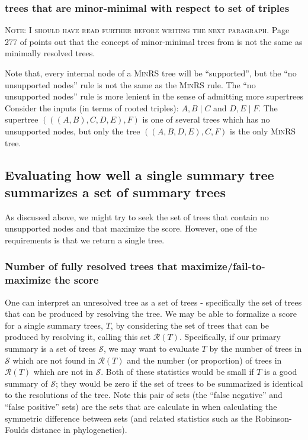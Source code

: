 \documentclass[11pt]{article}
\begin{document}
\subsubsection{trees that are minor-minimal with respect to set of triples}
\textsc{Note: I should have read \citet{JanssonLL2012} further before writing the next paragraph.}
Page 277 of \citet{JanssonLL2012} points out that the concept of minor-minimal trees from \citet{Semple2003} is not the same as minimally resolved trees.

Note that, every internal node of a \textsc{MinRS} tree will be ``supported'', but the
    ``no unsupported nodes'' rule is not the same as the \textsc{MinRS} rule.
The ``no unsupported nodes'' rule is more lenient in the sense of admitting more supertrees
Consider the inputs (in terms of rooted triples): $A,B\mid C$ and $D,E\mid F$.
The supertree $(((A,B),C,D,E),F)$ is one of several trees which has no unsupported nodes, but 
    only the tree $((A,B,D,E),C,F)$ is the only \textsc{MinRS} tree.


\subsection{Evaluating how well a single summary tree summarizes a set of summary trees}\label{treeAdmissibility}
As discussed above, we might try to seek the set of trees that contain no unsupported nodes and that
    maximize the \SWIPSD score.
However, one of the requirements is that we return a single tree.

\subsubsection{Number of fully resolved trees that maximize/fail-to-maximize the \SWIPSD score}
One can interpret an unresolved tree as a set of trees - specifically the set of trees that 
    can be produced by resolving the tree.
We may be able to formalize a score for a single summary trees, $T$, by considering
    the set of trees that can be produced by resolving it, calling this set $\mathcal{R}(T)$.
Specifically, if our primary summary is a set of trees $\mathcal{S}$, we may want
    to evaluate $T$ by the number of trees in $\mathcal{S}$ which are not found
    in $\mathcal{R}(T)$ 
    and the number (or proportion) of trees in $\mathcal{R}(T)$ which
    are not in $\mathcal{S}$.
Both of these statistics would be small if $T$ is a good summary of $\mathcal{S}$; they 
    would be zero if the set of trees to be summarized is identical to the resolutions
    of the tree.
Note this pair of sets (the ``false negative'' and ``false positive'' sets) are the
    sets that are calculate in when calculating the symmetric difference between 
    sets (and related statistics such as the Robinson-Foulds distance in phylogenetics).
\end{document}
